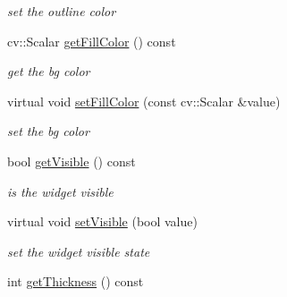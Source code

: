 \begin{DoxyCompactItemize}
\begin{DoxyCompactList}\small\item\em set the outline color \end{DoxyCompactList}\item 
cv\+::\+Scalar \hyperlink{classcanvascv_1_1Widget_a0563e98b43c8eba6760a3f5157619104}{get\+Fill\+Color} () const \hypertarget{classcanvascv_1_1Widget_a0563e98b43c8eba6760a3f5157619104}{}\label{classcanvascv_1_1Widget_a0563e98b43c8eba6760a3f5157619104}

\begin{DoxyCompactList}\small\item\em get the bg color \end{DoxyCompactList}\item 
virtual void \hyperlink{classcanvascv_1_1Widget_a527b421eb4503da4275df8f6685ad8ea}{set\+Fill\+Color} (const cv\+::\+Scalar \&value)\hypertarget{classcanvascv_1_1Widget_a527b421eb4503da4275df8f6685ad8ea}{}\label{classcanvascv_1_1Widget_a527b421eb4503da4275df8f6685ad8ea}

\begin{DoxyCompactList}\small\item\em set the bg color \end{DoxyCompactList}\item 
bool \hyperlink{classcanvascv_1_1Widget_adc23c79ecc1cbb20343a678854b82c9f}{get\+Visible} () const \hypertarget{classcanvascv_1_1Widget_adc23c79ecc1cbb20343a678854b82c9f}{}\label{classcanvascv_1_1Widget_adc23c79ecc1cbb20343a678854b82c9f}

\begin{DoxyCompactList}\small\item\em is the widget visible \end{DoxyCompactList}\item 
virtual void \hyperlink{classcanvascv_1_1Widget_a3c9bd8b6b90dbe3958e452e04843feb1}{set\+Visible} (bool value)\hypertarget{classcanvascv_1_1Widget_a3c9bd8b6b90dbe3958e452e04843feb1}{}\label{classcanvascv_1_1Widget_a3c9bd8b6b90dbe3958e452e04843feb1}

\begin{DoxyCompactList}\small\item\em set the widget visible state \end{DoxyCompactList}\item 
int \hyperlink{classcanvascv_1_1Widget_a75c8818ca95f88f674d9e4668c5071c6}{get\+Thickness} () const \hypertarget{classcanvascv_1_1Widget_a75c8818ca95f88f674d9e4668c5071c6}{}\label{classcanvascv_1_1Widget_a75c8818ca95f88f674d9e4668c5071c6}


\end{DoxyCompactItemize}
